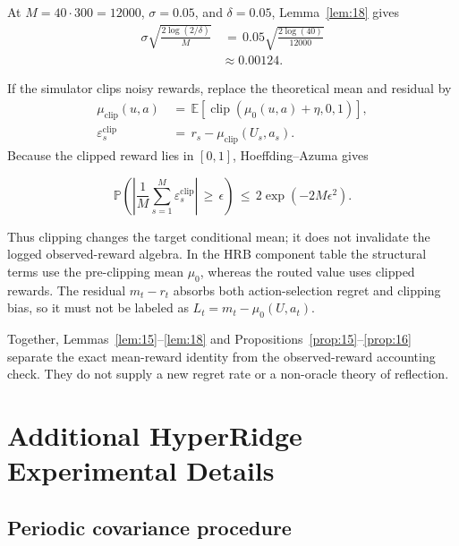 \documentclass{article} %
\begin{document}
At \(M=40\cdot300=12000\), \(\sigma=0.05\), and \(\delta=0.05\),
Lemma~\ref{lem:18} gives
\begin{equation}
\begin{aligned}
\sigma\sqrt{\frac{2\log(2/\delta)}{M}}
&\,=\,
0.05\sqrt{\frac{2\log(40)}{12000}}
\\
&\approx
0.00124.
\end{aligned}
\end{equation}

If the simulator clips noisy rewards, replace the theoretical mean and
residual by
\begin{equation}
\begin{aligned}
\mu_{\mathrm{clip}}(u,a)
&\,=\,
\mathbb{E}\!\left[
\operatorname{clip}\!\left(\mu_0(u,a)+\eta,0,1\right)
\right],
\\
\varepsilon^{\mathrm{clip}}_s
&\,=\,
r_s-\mu_{\mathrm{clip}}(U_s,a_s).
\end{aligned}
\end{equation}
Because the clipped reward lies in \([0,1]\), Hoeffding--Azuma gives

\begin{equation}
\label{eq:app-six-clipped-tail}
\mathbb{P}\!\left(
\left|
\frac{1}{M}\sum_{s=1}^{M}\varepsilon^{\mathrm{clip}}_s
\right|
\,\ge\,
\epsilon
\right)
\,\le\,
2\exp(-2M\epsilon^2).
\end{equation}

Thus clipping changes the target conditional mean; it does not invalidate the
logged observed-reward algebra. In the HRB component table the structural terms use
the pre-clipping mean \(\mu_0\), whereas the routed value uses clipped rewards.
The residual \(m_t-r_t\) absorbs both action-selection regret and clipping
bias, so it must not be labeled as \(L_t=m_t-\mu_0(U,a_t)\).

Together, Lemmas~\ref{lem:15}--\ref{lem:18} and
Propositions~\ref{prop:15}--\ref{prop:16} separate the exact mean-reward
identity from the observed-reward accounting check. They do not supply a new
regret rate or a non-oracle theory of reflection.

\section{Additional HyperRidge Experimental Details}
\label{app:hyper-experiments}

\subsection{Periodic covariance procedure}
\end{document}
